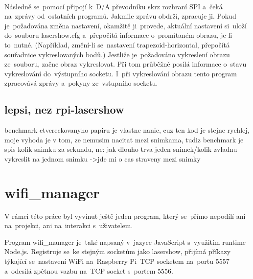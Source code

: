 \





Následně se~pomocí připojí k~D/A převodníku skrz rozhraní SPI\cite{wiki-SPI} a~čeká na~zprávy od~ostatních programů. Jakmile zprávu obdrží, zpracuje ji.
Pokud je~požadována změna nastavení, okamžitě ji~provede, aktuální nastavení si~uloží do~souboru lasershow.cfg a~přepočítá informace o~promítaném obrazu, je-li to~nutné.
(Například, změní-li se~nastavení trapezoid-horizontal, přepočítá souřadnice vykreslovaných bodů.) Jestliže je~požadováno vykreslení obrazu ze~souboru, začne obraz vykreslovat.
Při tom průběžně posílá informace o~stavu vykreslování do~výstupního socketu. I~při vykreslování obrazu tento program zpracovává zprávy a~pokyny ze~vstupního socketu.



\subsection{lepsi, nez rpi-lasershow}
benchmark ctvereckovanyho papiru je vlastne nanic, cuz ten kod je stejne rychlej, moje vyhoda je v tom, ze nemusim nacitat mezi snimkama, tudiz benchmark je spis kolik snimku za sekundu, ne: jak dlouho trva jeden snimek/kolik zvladnu vykreslit na jednom snimku
->jde mi o cas straveny mezi snimky

\section{wifi\_manager}

V rámci této práce byl vyvinut ještě jeden program, který se~přímo nepodílí ani na~projekci, ani na~interakci s~uživatelem.

Program wifi\_manager je~také napsaný v~jazyce JavaScript s~využitím runtime Node.js. Registruje se~ke stejným socketům jako lasershow, přijímá příkazy týkající se~nastavení WiFi na~Raspberry Pi~TCP socketem na~portu 5557 a~odesílá zpětnou vazbu na~TCP socket s~portem 5556.


